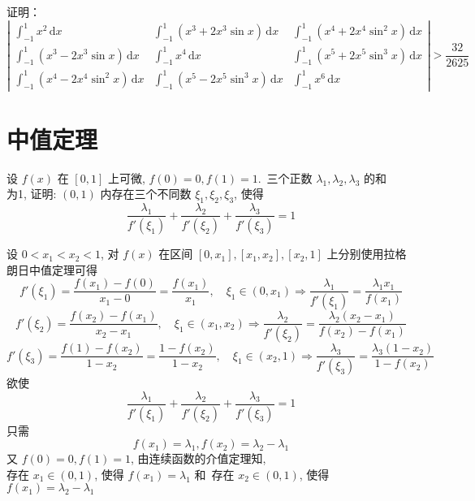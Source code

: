 \documentclass[color=green,titlestyle=hang]{elegantbook}%
\begin{document}
\begin{exercise}
证明：\begin{equation*}
\left|\begin{array}{lll}
\int_{-1}^{1}x^2\,\mathrm{d}x&\int_{-1}^{1}(x^3+2x^3\sin x)\,\mathrm{d}x &\int_{-1}^{1}(x^4+2x^4\sin^2x)\,\mathrm{d}x \\[4mm]
\int_{-1}^{1}(x^3-2x^3\sin x)\,\mathrm{d}x&\int_{-1}^{1}x^4\,\mathrm{d}x &\int_{-1}^{1}(x^5+2x^5\sin^3x)\,\mathrm{d}x\\[4mm]
\int_{-1}^{1}(x^4-2x^4\sin^2x)\,\mathrm{d}x&\int_{-1}^{1}(x^5-2x^5\sin^3x)\,\mathrm{d}x&\int_{-1}^{1}x^6\,\mathrm{d}x
\end{array}\right|>\frac{32}{2625}
\end{equation*}	
\end{exercise}\begin{Solution}
\end{Solution}

\chapter{中值定理}

\begin{exercise}设 $f(x)$ 在 $[0,1]$ 上可微, $f(0)=0,f(1)=1$.\, 三个正数 $\lambda_1,\lambda_2,\lambda_3$ 的和\\
为1,	证明: $(0,1)$ 内存在三个不同数  $\xi_1,\xi_2,\xi_3$, 使得\[\frac{\lambda_1}{f'(\xi_1)}+\frac{\lambda_2}{f'(\xi_2)}+\frac{\lambda_3}{f'(\xi_3)}=1\]
\end{exercise}\begin{newproof}
设 $0<x_1<x_2<1$, 对 $f(x)$ 在区间 $[0,x_1],[x_1,x_2],[x_2,1]$ 上分别使用拉格朗日中值定理可得
\[f'(\xi_1)=\frac{f(x_1)-f(0)}{x_1-0}=\frac{f(x_1)}{x_1},\quad \xi_1\in(0,x_1)\Longrightarrow\frac{\lambda_1}{f'(\xi_1)}=\frac{\lambda_1x_1}{f(x_1)}\]
\[f'(\xi_2)=\frac{f(x_2)-f(x_1)}{x_2-x_1},\quad \xi_1\in(x_1,x_2)\Longrightarrow\frac{\lambda_2}{f'(\xi_2)}=\frac{\lambda_2(x_2-x_1)}{f(x_2)-f(x_1)}\]
\[f'(\xi_3)=\frac{f(1)-f(x_2)}{1-x_2}=\frac{1-f(x_2)}{1-x_2},\quad \xi_1\in(x_2,1)\Longrightarrow\frac{\lambda_3}{f'(\xi_3)}=\frac{\lambda_3(1-x_2)}{1-f(x_2)}\]
欲使\[\frac{\lambda_1}{f'(\xi_1)}+\frac{\lambda_2}{f'(\xi_2)}+\frac{\lambda_3}{f'(\xi_3)}=1\]
只需\[f(x_1)=\lambda_1,f(x_2)=\lambda_2-\lambda_1\] 
又 $f(0)=0,f(1)=1$, 由连续函数的介值定理知,\\
存在 $x_1\in(0,1)$, 使得 $f(x_1)=\lambda_1$ 和\, 存在 $x_2\in(0,1)$, 使得 $f(x_1)=\lambda_2-\lambda_1$ 
\end{newproof}
\end{document}
